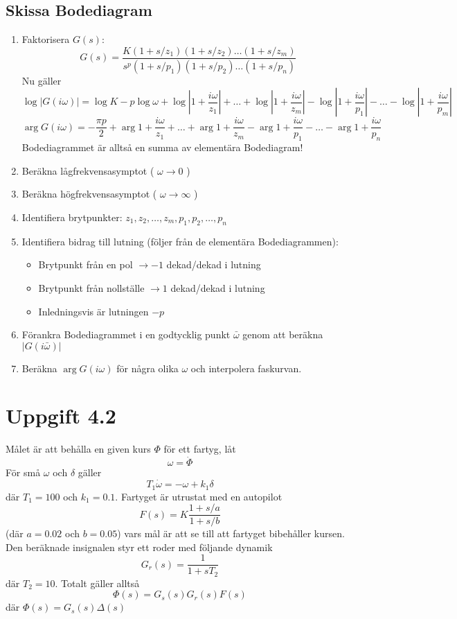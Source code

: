 \documentclass[12pt]{article}
\begin{document}
\subsection*{Skissa Bodediagram}

\begin{enumerate}
\item Faktorisera $G(s)$:
  \[G(s) = \frac{K(1+s/z_1)(1+s/z_2)\dots(1+s/z_m)}{s^p(1+s/p_1)(1+s/p_2)\dots(1+s/p_n)}\]
  Nu gäller 
  \[\log{|G(i\omega)|} = \log{K} - p\log{\omega} + \log{\left|1+\frac{i\omega}{z_1}\right|} + \dots + \log{\left| 1 + \frac{i\omega}{z_m}\right|} - \log{\left|1 + \frac{i\omega}{p_1}\right|} - \dots - \log{\left| 1 + \frac{i\omega}{p_m}\right|}\] 
  \[\arg{G(i\omega)} = -\frac{\pi p}{2} + \arg{1 + \frac{i\omega}{z_1}} + \dots + \arg{1+\frac{i\omega}{z_m}} - \arg{1 + \frac{i\omega}{p_1}} - \dots - \arg{1 + \frac{i\omega}{p_n}}\]
Bodediagrammet är alltså en summa av elementära Bodediagram!
\item Beräkna lågfrekvensasymptot ( $\omega \to 0$ ) 
\item Beräkna högfrekvensasymptot ( $\omega \to \infty$ )
\item Identifiera brytpunkter: $z_1, z_2, \dots, z_m, p_1, p_2, \dots, p_n$
\item Identifiera bidrag till lutning (följer från de elementära Bodediagrammen):
\begin{itemize}
\item Brytpunkt från en pol $\rightarrow -1$ dekad/dekad i lutning
\item Brytpunkt från nollställe $\rightarrow 1$ dekad/dekad i lutning
\item Inledningsvis är lutningen $-p$
\end{itemize}
\item Förankra Bodediagrammet i en godtycklig punkt $\bar{\omega}$ genom att beräkna $|G(i \bar{\omega})|$
\item Beräkna $\arg{G(i\omega)}$ för några olika $\omega$ och interpolera faskurvan.
\end{enumerate}

\section*{Uppgift 4.2}
Målet är att behålla en given kurs $\Phi$ för ett fartyg, låt 
\[\omega = \dot{\Phi}\]
För små $\omega$ och $\delta$ gäller 
\[T_1 \dot{\omega} = -\omega+k_1 \delta\]
där $T_1 = 100$ och $k_1 = 0.1$. Fartyget är utrustat med en autopilot 
\[F(s) = K \frac{1+s/a}{1+s/b}\]
(där $a = 0.02$ och $b = 0.05$) vars mål är att se till att fartyget bibehåller kursen. Den beräknade insignalen styr ett roder med följande dynamik 
\[G_r(s) = \frac{1}{1+sT_2}\]
där $T_2 = 10$. Totalt gäller alltså 
\[\Phi(s) = G_s(s)G_r(s)F(s)\]
där
$\Phi(s) = G_s(s) \Delta(s)$
\end{document}
